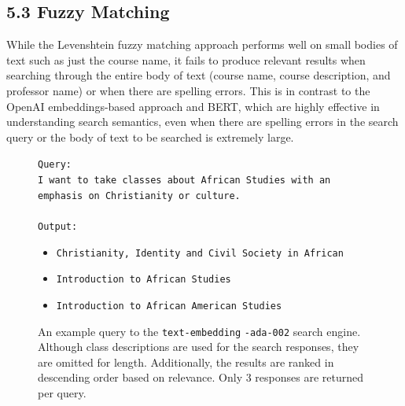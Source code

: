 \documentclass[
	a4paper, %
	10pt, %
	unnumberedsections, %
	twoside, %
]{LTJournalArticle}
\begin{document}
\subsection{5.3 Fuzzy Matching}


While the Levenshtein fuzzy matching approach performs well on small bodies of text such as just the course name, it fails to produce relevant results when searching through the entire body of text (course name, course description, and professor name) or when there are spelling errors. This is in contrast to the OpenAI embeddings-based approach and BERT, which are highly effective in understanding search semantics, even when there are spelling errors in the search query or the body of text to be searched is extremely large. 


\begin{figure}[h]
	\begin{center}
		\texttt{Query:} \\
		\texttt{I want to take classes about African Studies with an emphasis on Christianity or culture.} \\
		\texttt{}\\
		\texttt{Output:} 
		\begin{itemize}
			\item \texttt{Christianity, Identity and Civil Society in African}
			\item \texttt{Introduction to African Studies}
			\item \texttt{Introduction to African American Studies}
		\end{itemize}		
	\end{center}

	\caption{An example query to the \texttt{text-embedding} \texttt{-ada-002} search engine. Although class descriptions are used for the search responses, they are omitted for length. Additionally, the results are ranked in descending order based on relevance. Only 3 responses are returned per query.}
	\label{fig:ex1}
\end{figure}






\end{document}
